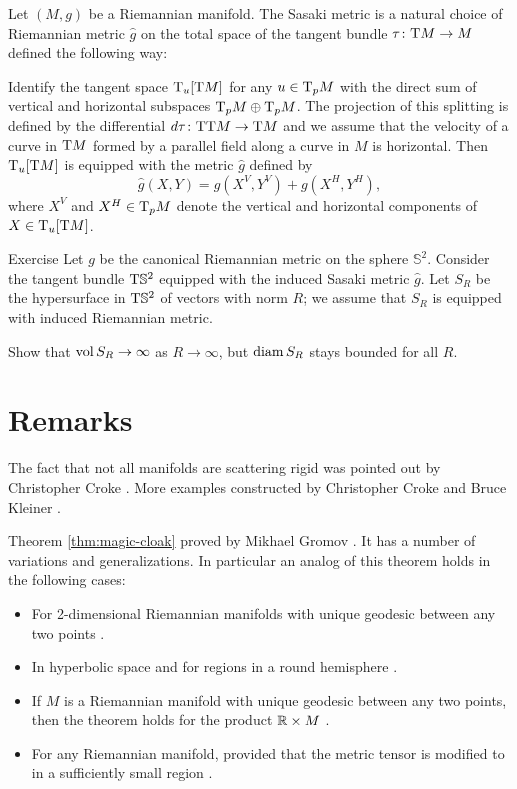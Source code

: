 \bigskip

Let $(M,g)$ be a Riemannian manifold.
The Sasaki metric is a natural choice of Riemannian metric $\hat g$ on the total space of the tangent bundle $\tau\colon\mathrm{T} M\to M$ defined the following way:

Identify the tangent space 
$\mathrm{T}_u[\mathrm{T} M]$ for any $u\z\in \T_p M$ with the direct sum of vertical and horizontal subspaces $\T_p M\z\oplus \T_p M$.
The projection of this splitting is defined by the differential $d\tau\colon\mathrm{T}\mathrm{T} M\to \mathrm{T} M$
and we assume that the velocity of a curve in $\mathrm{T} M$ formed by a parallel field along a curve in $M$ is horizontal.
Then $\mathrm{T}_u[\mathrm{T} M]$ is equipped with the metric $\hat g$ defined by
\[\hat g(X,Y)=g(X^V,Y^V)+g(X^H,Y^H),\]
where $X^V$ and $X^H\in\mathrm{T}_pM$ denote the vertical and horizontal components of $X\in\mathrm{T}_u[\mathrm{T} M]$.



\begin{thm}{Exercise}
Let $g$ be the canonical Riemannian metric on the sphere $\mathbb{S}^2$.
Consider the tangent bundle $\mathrm{T} \mathbb{S}^2$ 
equipped with the induced Sasaki metric $\hat g$.
Let $S_R$ be the hypersurface in $\mathrm{T} \mathbb{S}^2$ of vectors with norm $R$;
we assume that $S_R$ is equipped with induced Riemannian metric.

Show that $\operatorname{\rm vol}\nolimits S_R\to \infty$ as $R\to\infty$,
but $\operatorname{\rm diam}\nolimits S_R$ stays bounded for all $R$.
\end{thm}



\section{Remarks}

The fact that not all manifolds are scattering rigid was pointed out by Christopher Croke \cite{croke-1991}.
More examples constructed by Christopher Croke and Bruce Kleiner \cite{croke-kleiner-1994}.

Theorem \ref{thm:magic-cloak} proved by Mikhael Gromov \cite{gromov-1983}.
It has a number of variations and generalizations.
In particular an analog of this theorem holds in the following cases:
\begin{itemize}
\item For 2-dimensional Riemannian manifolds with unique geodesic between any two points \cite{pestov-uhlmann}.
\item In hyperbolic space \cite{besson-courtois-gallot-1995, } and for  regions in a round  hemisphere \cite{michel-1981}.
\item If $M$ is a Riemannian manifold with unique geodesic between any two points, then the theorem holds for the product $\mathbb{R}\times M$ \cite{croke-kleiner-1998}.
\item For any Riemannian manifold, provided that the metric tensor is modified to in a sufficiently small region \cite{burago-ivanov-2010}.
\end{itemize}



